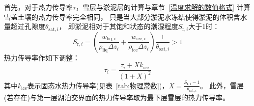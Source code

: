 首先，对于热力传导率$\tau$，雪层与淤泥层的计算与章节~\ref{温度求解的数值格式} 计算雪盖土壤的热力传导率完全相同，
只是当大部分淤泥水冻结使得淤泥的体积含水量超过孔隙度$\theta_{\mathrm{sat},i}$，
即淤泥相对于其饱和状态的潮湿程度$S_{\mathrm{r},i}$大于1时：
\begin{equation}
  S_{\mathrm{r},i}=\left(\frac{w_{\mathrm{liq},i}}{\rho_{\mathrm{liq}} \Delta z_{i}}+\frac{w_{\mathrm{ice},i}}{\rho_{\mathrm{ice}} \Delta z_{i}}\right)
  \frac{1}{\theta_{\mathrm{sat},i}}>1
\end{equation}
热力传导率作如下调整：
\begin{equation}
  \tau_{i}=\frac{\tau_{i}+X k_{\mathrm {ice}}}{(1+X)^{2}}
\end{equation}
其中$k_{\mathrm {ice}}$表示固态水热力传导率(见表~\ref{tab:物理常数})，$X=\frac{S_{\mathrm{r},i}-1}{\theta_{\mathrm{sat},i}}$。
此外，雪层(若存在)与第一层湖泊交界面的热力传导率取为最下层雪层的热力传导率。

